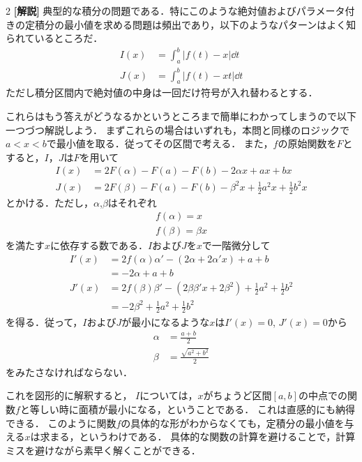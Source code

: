 \documentclass[../../main.tex]{subfiles}
\begin{document}
\begin{multicols}{2}
  {\bf[解説]}
  典型的な積分の問題である．特にこのような絶対値およびパラメータ付きの定積分の最小値を求める問題は頻出であり，以下のようなパターンはよく知られているところだ．
  \begin{align}
    I(x) & = \int_{a}^{b}\left| f(t) - x\right| \dd t  \\
    J(x) & = \int_{a}^{b}\left| f(t) - xt\right| \dd t
  \end{align}
  ただし積分区間内で絶対値の中身は一回だけ符号が入れ替わるとする．%

  これらはもう答えがどうなるかというところまで簡単にわかってしまうので以下一つづつ解説しよう．
  まずこれらの場合はいずれも，本問と同様のロジックで$a<x<b$で最小値を取る．従ってその区間で考える．
  また，$f$の原始関数を$F$とすると，$I$，$J$は$F$を用いて
  \begin{align}
    I(x) & = 2F(\alpha) - F(a) - F(b) - 2\alpha x + ax + bx                             \\
    J(x) & = 2F(\beta) - F(a) - F(b)  - \beta^2 x + \frac{1}{2}a^2 x + \frac{1}{2}b^2 x
  \end{align}
  とかける．ただし，$\alpha$,$\beta$はそれぞれ
  \begin{align}
    f(\alpha) = x \\
    f(\beta)  = \beta x
  \end{align}
  を満たす$x$に依存する数である．$I$および$J$を$x$で一階微分して
  \begin{align*}
    I'(x)
     & = 2f(\alpha)\alpha' - (2\alpha + 2\alpha' x) + a +b                                 \\
     & = -2\alpha + a + b                                                                  \\
    J'(x)
     & = 2f(\beta)\beta'   - (2\beta\beta' x + 2\beta^2) + \frac{1}{2}a^2 + \frac{1}{2}b^2 \\
     & = -2\beta^2 + \frac{1}{2}a^2 + \frac{1}{2}b^2
  \end{align*}
  を得る．従って，$I$および$J$が最小になるような$x$は$I'(x)=0$, $J'(x)=0$から
  \begin{align}
    \alpha & = \frac{a+b}{2}            \\
    \beta  & = \frac{\sqrt{a^2+b^2}}{2}
  \end{align}
  をみたさなければならない．

  これを図形的に解釈すると，
  $I$については，$x$がちょうど区間$[a,b]$の中点での関数$f$と等しい時に面積が最小になる，ということである．
  これは直感的にも納得できる．%
  このように関数$f$の具体的な形がわからなくても，定積分の最小値を与える$x$は求まる，というわけである．
  具体的な関数の計算を避けることで，計算ミスを避けながら素早く解くことができる．


\end{multicols}
\end{document}
